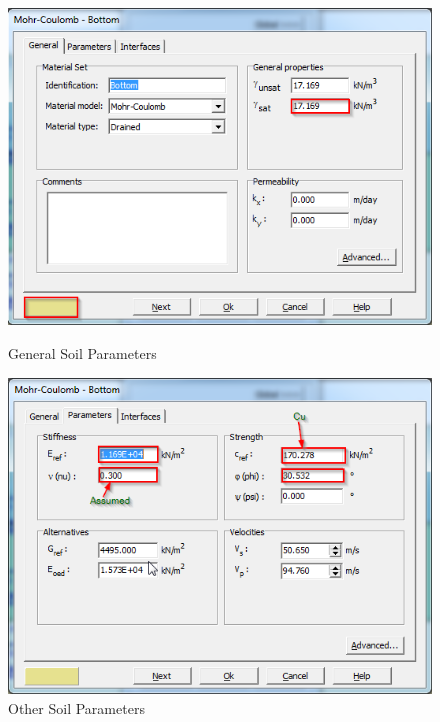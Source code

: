 \begin{landscape}
\begin{figure}[hbtp]
\begin{minipage}[c]{0.4\linewidth}
  \includegraphics[width=\linewidth, height=0.4\textheight,keepaspectratio]{images/plx/a (6).png}
  \caption{General Soil Parameters}
  \vfill
  \includegraphics[width=\linewidth, height=0.4\textheight,keepaspectratio]{images/plx/a (7).png}
  \caption{Other Soil Parameters}
  \end{minipage}
  \hfill
\end{figure}
\end{landscape}
\break
